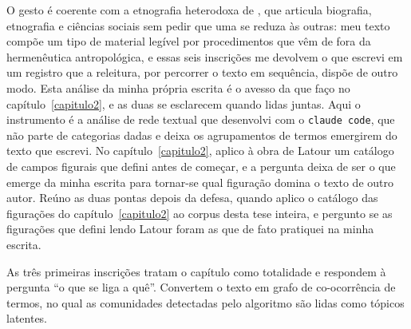 O gesto é coerente com a etnografia heterodoxa de \textcite[pp.~291--303]{Kofes2015Maconaria}, que articula biografia, etnografia e ciências sociais sem pedir que uma se reduza às outras: meu texto compõe um tipo de material legível por procedimentos que vêm de fora da hermenêutica antropológica, e essas seis inscrições me devolvem o que escrevi em um registro que a releitura, por percorrer o texto em sequência, dispõe de outro modo. Esta análise da minha própria escrita é o avesso da que faço no capítulo~\ref{capitulo2}, e as duas se esclarecem quando lidas juntas. Aqui o instrumento é a análise de rede textual que desenvolvi com o \texttt{claude code}, que não parte de categorias dadas e deixa os agrupamentos de termos emergirem do texto que escrevi. No capítulo~\ref{capitulo2}, aplico à obra de Latour um catálogo de campos figurais que defini antes de começar, e a pergunta deixa de ser o que emerge da minha escrita para tornar-se qual figuração domina o texto de outro autor. Reúno as duas pontas depois da defesa, quando aplico o catálogo das figurações do capítulo~\ref{capitulo2} ao corpus desta tese inteira, e pergunto se as figurações que defini lendo Latour foram as que de fato pratiquei na minha escrita.

\medskip

As três primeiras inscrições tratam o capítulo como totalidade e respondem à pergunta \enquote{o que se liga a quê}. Convertem o texto em grafo de co-ocorrência de termos, no qual as comunidades detectadas pelo algoritmo são lidas como tópicos latentes.

